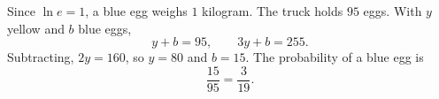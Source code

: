 Since $\ln e=1$, a blue egg weighs $1$ kilogram. The truck holds $95$ eggs. With $y$ yellow and $b$ blue eggs,
\[
y+b=95,\qquad 3y+b=255 .
\]
Subtracting, $2y=160$, so $y=80$ and $b=15$. The probability of a blue egg is
\[
\dfrac{15}{95}=\boxed{\dfrac{3}{19}} .
\]
